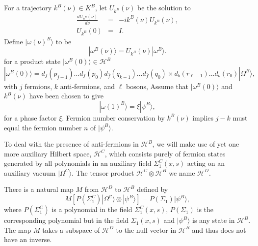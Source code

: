 \documentclass[12pt,amsmath,amssymb,onecolumn]{revtex4-2}
\begin{document}
For a trajectory $k^B(\nu) \in K^B$, let $U_{k^B}(\nu)$ be the solution to 
\begin{subequations}
\begin{eqnarray}
\label{udoty}
\frac{dU_{k^B}(\nu)}{d \nu} & = &-i k^B( \nu) U_{k^B}( \nu), \\
\label{uboundary0y}
U_{k^B}( 0) & = & I.
\end{eqnarray}
\end{subequations}
Define $|\omega(\nu)^B \rangle $ to be 
\begin{equation}
\label{omegaofty}
|\omega^B( \nu) \rangle  = U_{k^B}(\nu)|\omega^B \rangle.
\end{equation}
for a product state $|\omega^B(0) \rangle  \in \mathcal{H}^B$
\begin{equation}
\label{productstate2}
|\omega^B(0) \rangle  =
d_f( p_{j - 1}) ... d_f( p_0)   d_{\bar{f}}( q_{k - 1}) ... d_{\bar{f}}( q_0) \times
  d_b( r_{\ell-1}) ... d_b( r_0)  |\Omega^B \rangle ,
\end{equation}
with $j$ fermions, $k$ anti-fermions, and $\ell$ bosons,
Assume that $|\omega^B(0) \rangle$ and $k^B(\nu)$ have been chosen
to give
\begin{equation}
\label{upsiphi1y}
|\omega(1)^B \rangle  = \xi |\psi^B \rangle , 
\end{equation}
for a phase factor $\xi$.
Fermion number conservation by $k^B(\nu)$ implies $j - k$ must equal the
fermion number $n$ of $|\psi^B \rangle $.

To deal with the presence of anti-fermions in  $\mathcal{H}^B$,
we will make use of yet one more auxiliary Hilbert space,
$\mathcal{H}^C$, which consists purely 
of fermion states generated by all polynomials
in an auxiliary field $\Sigma^C_1(x,s)$ acting on an auxiliary vacuum $|\Omega^C \rangle $.
The tensor product $\mathcal{H}^C \otimes \mathcal{H}^B$ we name $\mathcal{H}^D$.

There is
a natural map $M$ from $\mathcal{H}^D$ to
$\mathcal{H}^B$ defined by
\begin{equation}
  \label{defM}
  M [ P( \Sigma_1^C) |\Omega^\mathcal{C} \rangle  \otimes |\psi^B \rangle ] = P( \Sigma_1) |\psi^B \rangle ,
\end{equation}
where $P( \Sigma_1^C)$ is a polynomial in the field $\Sigma_1^C(x, s)$,
$P( \Sigma_1)$ is the corresponding polynomial but in the field $\Sigma_1(x, s)$ and
$|\psi^B \rangle $ is any state in $\mathcal{H}^B$.
The map $M$ takes a subspace of $\mathcal{H}^D$ to the null vector in $\mathcal{H}^B$ and
thus does not have an inverse. 
\end{document}
